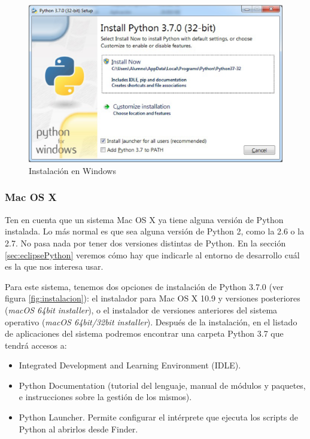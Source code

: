\begin{figure}
\begin{center}
\includegraphics[height=0.5\textwidth]{imagenes/windows}
\end{center}
\caption{Instalación en Windows}
\label{fig:windows}
\end{figure}

\subsubsection{Mac OS X}

Ten en cuenta que un sistema Mac OS X ya tiene alguna versión de Python instalada. Lo más normal es que sea alguna versión de Python 2, como la 2.6 o la 2.7. No pasa nada por tener dos versiones distintas de Python. En la sección \ref{sec:eclipsePython} veremos cómo hay que indicarle al entorno de desarrollo cuál es la que nos interesa usar.

Para este sistema, tenemos dos opciones de instalación de Python 3.7.0 (ver figura \ref{fig:instalacion}): el instalador para Mac OS X 10.9 y versiones posteriores (\emph{macOS 64bit installer}), o el instalador de versiones anteriores del sistema operativo (\emph{macOS 64bit/32bit installer}). Después de la instalación, en el listado de aplicaciones del sistema podremos encontrar una carpeta Python 3.7 que tendrá accesos a:
\begin{itemize}
	\item Integrated Development and Learning Environment (IDLE).
	\item Python Documentation (tutorial del lenguaje, manual de módulos y paquetes, e instrucciones sobre la gestión de los mismos).
	\item Python Launcher. Permite configurar el intérprete que ejecuta los scripts de Python al abrirlos desde Finder.
\end{itemize}

